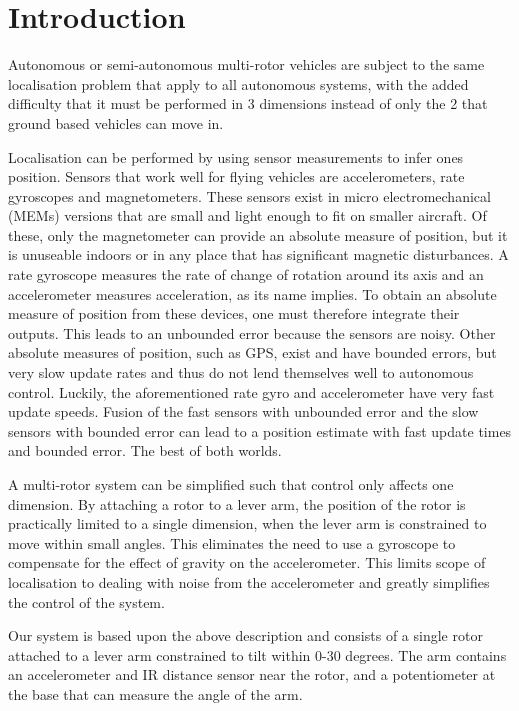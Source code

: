 

\section*{Introduction}

Autonomous or semi-autonomous multi-rotor vehicles are subject to the 
same localisation problem that apply to all autonomous systems, with the added
difficulty that it must be performed in 3 dimensions instead of only 
the 2 that ground based vehicles can move in. 

Localisation can be performed by using sensor measurements to infer
ones position. Sensors that work well for flying vehicles are accelerometers,
rate gyroscopes and magnetometers. These sensors exist in micro electromechanical
(MEMs) versions that are small and light enough to fit on smaller aircraft.
Of these, only the magnetometer can provide
an absolute measure of position, but it is unuseable indoors or in any place
that has significant magnetic disturbances. A rate gyroscope measures the
rate of change of rotation around its axis and an accelerometer measures
acceleration, as its name implies. To obtain an absolute measure of position
from these devices, one must therefore integrate their outputs. This leads
to an unbounded error because the sensors are noisy. Other absolute measures 
of position, such as GPS, exist and have bounded errors, but very slow update
rates and thus do not lend themselves well to autonomous control. Luckily,
the aforementioned rate gyro and accelerometer have very fast update speeds.
Fusion of the fast sensors with unbounded error and the slow sensors with bounded
error can lead to a position estimate with fast update times and bounded error.
The best of both worlds.

A multi-rotor system can be simplified such that control only affects one dimension.
By attaching a rotor to a lever arm, the position of the rotor is practically limited
to a single dimension, when the lever arm is constrained to move within small angles.
This eliminates the need to use a gyroscope to compensate for the effect of gravity
on the accelerometer. This limits scope of localisation to dealing with noise
from the accelerometer and greatly simplifies the control of the system.

Our system is based upon the above description and consists of a single rotor attached
to a lever arm constrained to tilt within 0-30 degrees. The arm contains an accelerometer
and IR distance sensor near the rotor, and a potentiometer at the base that can measure
the angle of the arm.

